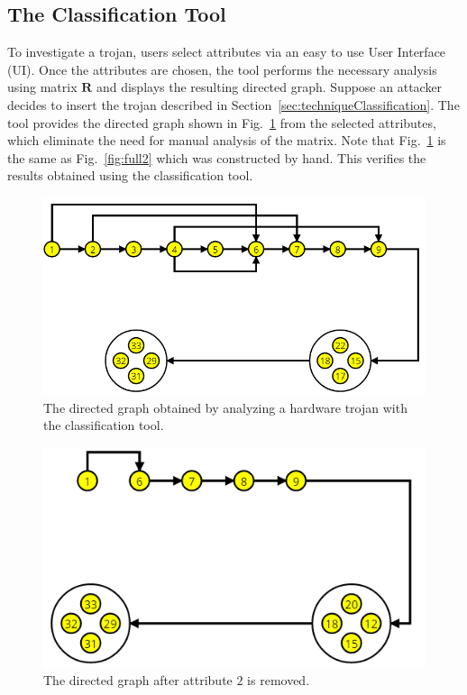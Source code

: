 \subsection{The Classification Tool} \label{sec:toolClassification}
To investigate a trojan, users select attributes via an easy to use User Interface (UI).
Once the attributes are chosen, the tool performs the necessary analysis using matrix $\mathbf{R}$ and displays the resulting directed graph.
Suppose an attacker decides to insert the trojan described in Section~\ref{sec:techniqueClassification}. %
The tool provides the directed graph shown in Fig.~\ref{fig:visualRepresentaion} from the selected attributes, which eliminate the
need for manual analysis of the matrix.
Note that Fig.~\ref{fig:visualRepresentaion} is the same as Fig.~\ref{fig:full2} which was constructed by hand.
This verifies the results obtained using the classification tool.
\begin{figure}[h]
	\centering
	\includegraphics[width=0.9\linewidth]{figures/visualRepresentaion}
	\caption{The directed graph obtained by analyzing a hardware trojan with the classification tool.}
	\label{fig:visualRepresentaion}
\end{figure}
\begin{figure}[h]
	\centering
	\includegraphics[width=0.75\linewidth]{figures/visualRepresentaion2}
	\caption{The directed graph after attribute $2$ is removed.}
	\label{fig:visualRepresentaion2}
\end{figure}

